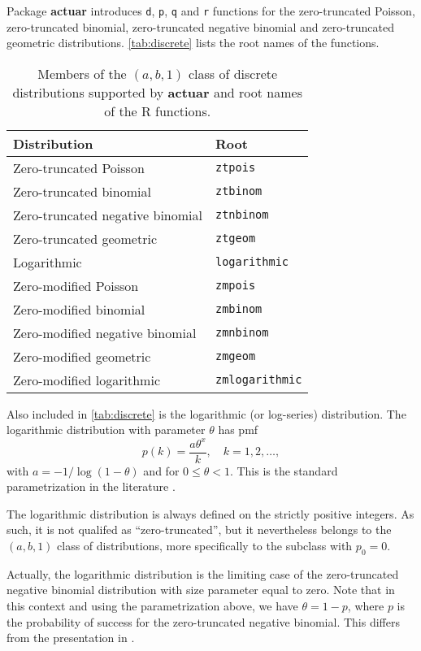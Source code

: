 \documentclass[x11names]{article}
\newcommand{\proglang}[1]{\textsf{#1}}
\newcommand{\pkg}[1]{\textbf{#1}}
\newcommand{\code}[1]{\texttt{#1}}
\begin{document}
Package \pkg{actuar} introduces \code{d}, \code{p}, \code{q} and
\code{r} functions for the zero-truncated Poisson, zero-truncated
binomial, zero-truncated negative binomial and zero-truncated
geometric distributions. \autoref{tab:discrete} lists the root names
of the functions.

\begin{table}
  \centering
  \begin{tabular}{ll}
    \toprule
    Distribution & Root \\
    \midrule
    Zero-truncated Poisson & \code{ztpois} \\
    Zero-truncated binomial & \code{ztbinom} \\
    Zero-truncated negative binomial & \code{ztnbinom} \\
    Zero-truncated geometric & \code{ztgeom} \\
    Logarithmic & \code{logarithmic} \\
    \addlinespace[6pt]
    Zero-modified Poisson & \code{zmpois} \\
    Zero-modified binomial & \code{zmbinom} \\
    Zero-modified negative binomial & \code{zmnbinom} \\
    Zero-modified geometric & \code{zmgeom} \\
    Zero-modified logarithmic & \code{zmlogarithmic} \\
    \bottomrule
  \end{tabular}
  \caption{Members of the $(a, b, 1)$ class of discrete distributions
    supported by \pkg{actuar} and root names of the \proglang{R}
    functions.}
  \label{tab:discrete}
\end{table}

Also included in \autoref{tab:discrete} is the logarithmic (or
log-series) distribution. The logarithmic distribution with parameter
$\theta$ has pmf
\begin{equation*}
  p(k) = \frac{a \theta^x}{k}, \quad k = 1, 2, \dots,
\end{equation*}
with $a = -1/\log(1 - \theta)$ and for $0 \leq \theta < 1$. This is
the standard parametrization in the literature
\citep{Johnson:discrete:2005}.

The logarithmic distribution is always defined on the strictly
positive integers. As such, it is not qualifed as ``zero-truncated'',
but it nevertheless belongs to the $(a, b, 1)$ class of distributions,
more specifically to the subclass with $p_0 = 0$.

Actually, the logarithmic distribution is the limiting case of the
zero-truncated negative binomial distribution with size parameter
equal to zero. Note that in this context and using the parametrization
above, we have $\theta = 1 - p$, where $p$ is the probability of
success for the zero-truncated negative binomial. This differs from
the presentation in \citet{LossModels4e}.
\end{document}
